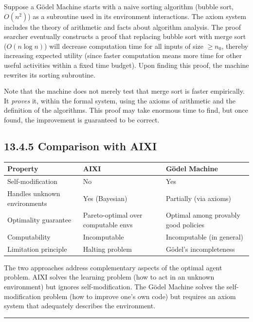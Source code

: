 \begin{example}
Suppose a Gödel Machine starts with a naive sorting algorithm (bubble sort, $O(n^2)$) as a subroutine used in its environment interactions. The axiom system includes the theory of arithmetic and facts about algorithm analysis. The proof searcher eventually constructs a proof that replacing bubble sort with merge sort ($O(n \log n)$) will decrease computation time for all inputs of size $\geq n_0$, thereby increasing expected utility (since faster computation means more time for other useful activities within a fixed time budget). Upon finding this proof, the machine rewrites its sorting subroutine.

Note that the machine does not merely test that merge sort is faster empirically. It \textit{proves} it, within the formal system, using the axioms of arithmetic and the definition of the algorithms. This proof may take enormous time to find, but once found, the improvement is guaranteed to be correct.
\end{example}

\subsection{13.4.5 Comparison with AIXI}

\begin{tabular}{|l|l|l|}
\hline
Property & AIXI & Gödel Machine \\
\hline
Self-modification & No & Yes \\
Handles unknown environments & Yes (Bayesian) & Partially (via axioms) \\
Optimality guarantee & Pareto-optimal over computable envs & Optimal among provably good policies \\
Computability & Incomputable & Incomputable (in general) \\
Limitation principle & Halting problem & Gödel's incompleteness \\
\hline
\end{tabular}


The two approaches address complementary aspects of the optimal agent problem. AIXI solves the learning problem (how to act in an unknown environment) but ignores self-modification. The Gödel Machine solves the self-modification problem (how to improve one's own code) but requires an axiom system that adequately describes the environment.

\bigskip\hrule\bigskip

